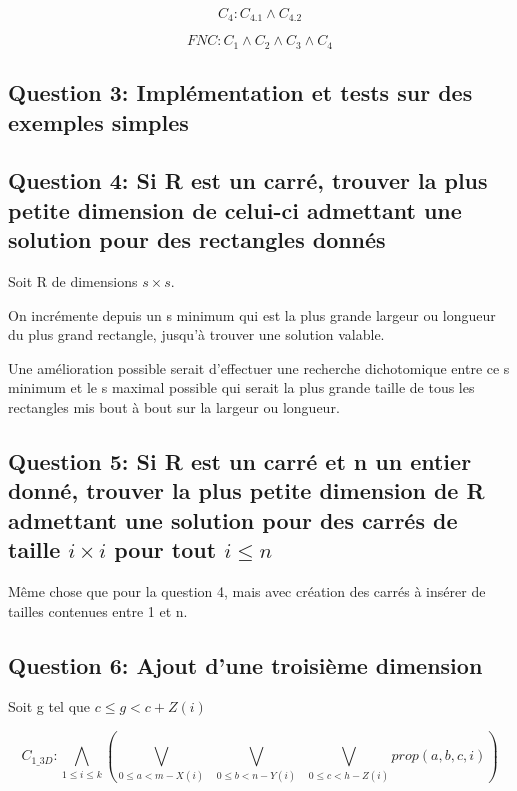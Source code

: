 \documentclass[a4paper,10pt]{article}
\begin{document}
\begin{center}
$$C_4: C_{4.1} \wedge C_{4.2}$$
\end{center}


\begin{center}
$$FNC: C_1 \wedge C_2 \wedge C_3 \wedge C_4$$
\end{center}

\newpage

\subsection{Question 3: Implémentation et tests sur des exemples simples}

\subsection{Question 4: Si R est un carré, trouver la plus petite dimension de celui-ci admettant une solution pour des rectangles donnés}

Soit R de dimensions $s \times s$.

On incrémente depuis un s minimum qui est la plus grande largeur ou longueur du plus grand rectangle, jusqu'à trouver une solution valable.

Une amélioration possible serait d'effectuer une recherche dichotomique entre ce s minimum et le s maximal possible qui serait la plus grande taille de tous les rectangles mis bout à bout sur la largeur ou longueur.

\subsection{Question 5: Si R est un carré et n un entier donné, trouver la plus petite dimension de R admettant une solution pour des carrés de taille $i \times i$ pour tout $i \leq n$}

Même chose que pour la question 4, mais avec création des carrés à insérer de tailles contenues entre 1 et n.

\subsection{Question 6: Ajout d'une troisième dimension}

Soit g tel que $c \leq g < c + Z(i)$

$$C_{1\_3D} : \bigwedge_{1 \leq i \leq k} ( \bigvee_{0 \leq a < m - X(i)}\;\; \bigvee_{0 \leq b < n - Y(i)}\;\; \bigvee_{0 \leq c < h - Z(i)} prop(a,b,c,i)) $$
\end{document}
